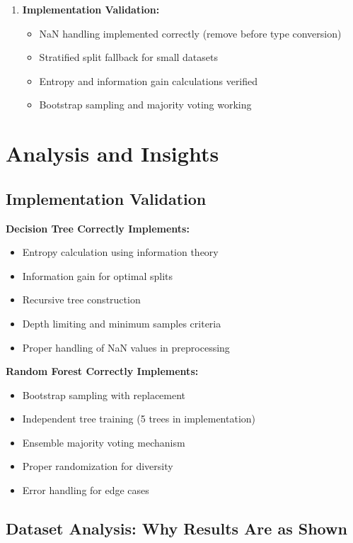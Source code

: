 \documentclass[14pt,a4paper]{report}
\begin{document}
\begin{enumerate}
    \item \textbf{Implementation Validation:}
    \begin{itemize}
        \item[\checkmark] NaN handling implemented correctly (remove before type conversion)
        \item[\checkmark] Stratified split fallback for small datasets
        \item[\checkmark] Entropy and information gain calculations verified
        \item[\checkmark] Bootstrap sampling and majority voting working
    \end{itemize}
\end{enumerate}

\section{Analysis and Insights}

\subsection{Implementation Validation}

\textbf{Decision Tree Correctly Implements:}
\begin{itemize}
    \item Entropy calculation using information theory
    \item Information gain for optimal splits
    \item Recursive tree construction
    \item Depth limiting and minimum samples criteria
    \item Proper handling of NaN values in preprocessing
\end{itemize}

\textbf{Random Forest Correctly Implements:}
\begin{itemize}
    \item Bootstrap sampling with replacement
    \item Independent tree training (5 trees in implementation)
    \item Ensemble majority voting mechanism
    \item Proper randomization for diversity
    \item Error handling for edge cases
\end{itemize}

\subsection{Dataset Analysis: Why Results Are as Shown}
\end{document}
